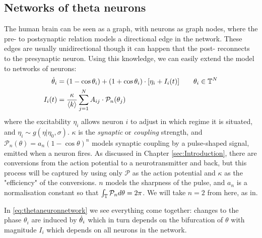 \subsection{Networks of theta neurons}
The human brain can be seen as a graph, with neurons as graph nodes, where the pre- to postsynaptic relation models a directional edge in the network. These edges are usually unidirectional though it can happen that the post- reconnects to the presynaptic neuron. Using this knowledge, we can easily extend the model to networks of neurons:
\begin{align}
\dot{\theta}_{i} &=\left(1-\cos \theta_{i}\right)+\left(1+\cos \theta_{i}\right) \cdot \left[\eta_{i} + I_{i}(t)\right] \qquad \theta_i \in \T^N  \label{eq:thetaneuronnetwork} \\
I_{i}(t) &=\frac{\kappa}{\kmean} \sum_{j=1}^{N} A_{i j} \cdot \mathcal{P}_{n}(\theta_{j}) \label{eq:thetaneuronnetworkcurrent}
\end{align}
where the excitability $\eta_i$ allows neuron $i$ to adjust in which regime it is situated, and $\eta_i \sim g(\eta \rvert \eta_0, \sigma)$. $\kappa$ is the \textsl{synaptic} or \textsl{coupling} strength, and $\mathcal{P}_n(\theta)  = a_n(1 - \cos \theta)^n$ models synaptic coupling by a pulse-shaped signal, emitted when a neuron fires. As discussed in Chapter \ref{sec:Introduction}, there are conversions from the action potential to a neurotransmitter and back, but this process will be captured by using only $\mathcal{P}$ as the action potential and $\kappa$ as the "efficiency" of the conversions. $n$ models the sharpness of the pulse, and $a_n$ is a normalisation constant so that $\int_{{\mathbb{T}}} \mathcal{P}_{n} d \theta=2 \pi$. We will take $n=2$ from here, as in\cite{Luke2013, OttAntonsen2017, Martens2020}. 

In \eqref{eq:thetaneuronnetwork} we see everything come together: changes to the phase $\theta_i$ are induced by ${\dot{\theta}}_i$ which in turn depends on the bifurcation of $\theta$ with magnitude $I_i$ which depends on all neurons in the network. \\


